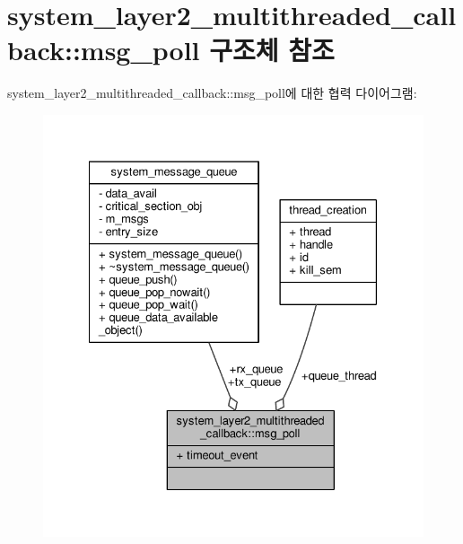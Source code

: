 \hypertarget{structavdecc__lib_1_1system__layer2__multithreaded__callback_1_1msg__poll}{}\section{system\+\_\+layer2\+\_\+multithreaded\+\_\+callback\+:\+:msg\+\_\+poll 구조체 참조}
\label{structavdecc__lib_1_1system__layer2__multithreaded__callback_1_1msg__poll}


system\+\_\+layer2\+\_\+multithreaded\+\_\+callback\+:\+:msg\+\_\+poll에 대한 협력 다이어그램\+:
\nopagebreak
\begin{figure}[H]
\begin{center}
\leavevmode
\includegraphics[width=328pt]{structavdecc__lib_1_1system__layer2__multithreaded__callback_1_1msg__poll__coll__graph}
\end{center}
\end{figure}
